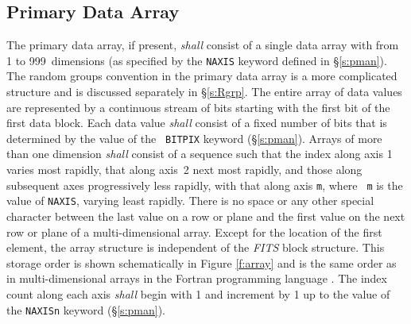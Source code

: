 \documentclass[11pt,makeidx]{book}     %
\begin{document}
   \subsection{Primary Data Array}
   The \label{s:pdata} primary data array, if
   present, {\em shall} consist of a  single data array with from 1 to
   999~dimensions (as specified by the {\tt NAXIS} keyword defined in
   \S\ref{s:pman}).   The random groups convention in the
   primary data array is a  more complicated structure and is discussed
   separately in \S\ref{s:Rgrp}.  The entire array of data values are
   represented by a continuous stream of  bits starting with the first
   bit of the first data block. Each data value {\em shall} consist of a
   fixed number of bits that is determined by the value of the {\tt
   BITPIX} keyword (\S\ref{s:pman}).  Arrays of more than
   one dimension {\em shall} consist of
   a sequence such that the index along axis 1 varies most rapidly,
   that along axis~2 next most rapidly, and those along subsequent axes
   progressively less rapidly, with that along axis {\tt m}, where {\tt
   m} is the value  of {\tt NAXIS}, varying least
   rapidly.    There is no space or any other special character between
   the last value on a row or plane and the first value on the  next row or plane
   of a multi-dimensional array. 
   Except for the
   location of the first element, the array structure is independent of 
   the {\em FITS\/} block structure.
   This storage  order
   is shown schematically in  Figure \ref{f:array} and is
   the same order as in multi-dimensional arrays in the 
   Fortran  programming language \cite{iso04}.
   The index count along each axis {\em shall} begin 
   with 1 and increment by 1 up to the value of 
   the {\tt NAXISn} keyword (\S\ref{s:pman}). 
\end{document}

